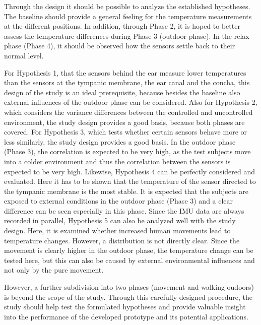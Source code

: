 Through the design it should be possible to analyze the established hypotheses.
The baseline should provide a general feeling for the temperature measurements at the different positions.
In addition, through Phase 2, it is hoped to better assess the temperature differences during Phase 3 (outdoor phase).
In the relax phase (Phase 4), it should be observed how the sensors settle back to their normal level.

For Hypothesis 1, that the sensors behind the ear measure lower temperatures than the sensors at the tympanic membrane, the ear canal and the concha, this design of the study is an ideal prerequisite, because besides the baseline also external influences of the outdoor phase can be considered.
Also for Hypothesis 2, which considers the variance differences between the controlled and uncontrolled environment, the study design provides a good basis, because both phases are covered.
For Hypothesis 3, which tests whether certain sensors behave more or less similarly, the study design provides a good basis.
In the outdoor phase (Phase 3), the correlation is expected to be very high, as the test subjects move into a colder environment and thus the correlation between the sensors is expected to be very high.
Likewise, Hypothesis 4 can be perfectly considered and evaluated. 
Here it has to be shown that the temperature of the sensor directed to the tympanic membrane is the most stable. 
It is expected that the subjects are exposed to external conditions in the outdoor phase (Phase 3) and a clear difference can be seen especially in this phase.
Since the IMU data are always recorded in parallel, Hypothesis 5 can also be analyzed well with the study design.
Here, it is examined whether increased human movements lead to temperature changes. 
However, a distribution is not directly clear. 
Since the movement is clearly higher in the outdoor phase, the temperature change can be tested here, but this can also be caused by external environmental influences and not only by the pure movement.

However, a further subdivision into two phases (movement and walking oudoors) is beyond the scope of the study.
Through this carefully designed procedure, the study should help test the formulated hypotheses and provide valuable insight into the performance of the developed prototype and its potential applications.

